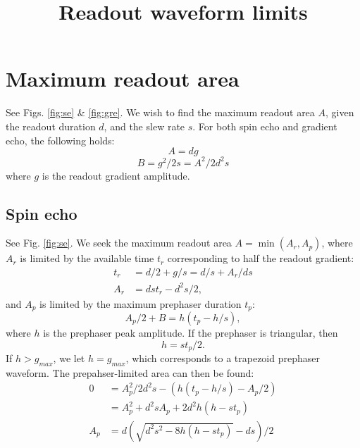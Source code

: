 \documentclass{article}
\title{Readout waveform limits}
\author{}
\date{}
\begin{document}

\section{Maximum readout area}
See Figs. \ref{fig:se} \& \ref{fig:gre}. 
We wish to find the maximum readout area $A$, given the readout duration $d$, and the slew rate $s$.
For both spin echo and gradient echo, the following holds:
\begin{equation}
    A = dg
    \label{eq:readArea}
\end{equation}
\begin{equation}
    B = g^2/{2s} = A^2/{2d^2 s}
    \label{eq:slewArea}
\end{equation}
where $g$ is the readout gradient amplitude.

\subsection{Spin echo}
See Fig. \ref{fig:se}. 
We seek the maximum readout area $A=\min(A_r, A_p)$, where $A_r$ is limited by the available time $t_r$ corresponding to half the readout gradient: 
\begin{equation}
    \begin{split}
        t_r & = d/2 + g/s = d/s + A_r / {ds} \\
        A_r & = dst_r-d^2s/2, 
    \end{split}
    \label{eq:halfReadoutTime}
\end{equation}
and $A_p$ is limited by the maximum prephaser duration $t_p$:
\begin{equation}
    A_p/2 + B = h(t_p-h/s),
\end{equation}
where $h$ is the prephaser peak amplitude. 
If the prephaser is triangular, then
\begin{equation}
    h = st_p/2.
    \label{eq:SEprephaserAmp}
\end{equation}
If $h>g_{max}$, we let $h=g_{max}$, which corresponds to a trapezoid prephaser waveform.
The prepahser-limited area can then be found:
\begin{equation}
    \begin{split}
        0 & = A_p^2/{2d^2 s} - (h(t_p-h/s)-A_p/2) \\
          & = A_p^2 + d^2sA_p+2d^2h(h-st_p) \\
      A_p & = d(\sqrt{d^2s^2 - 8h(h-st_p)} - ds)/2 \\
    \end{split}
    \label{eq:prephaserLimitedArea}
\end{equation}
\end{document}
